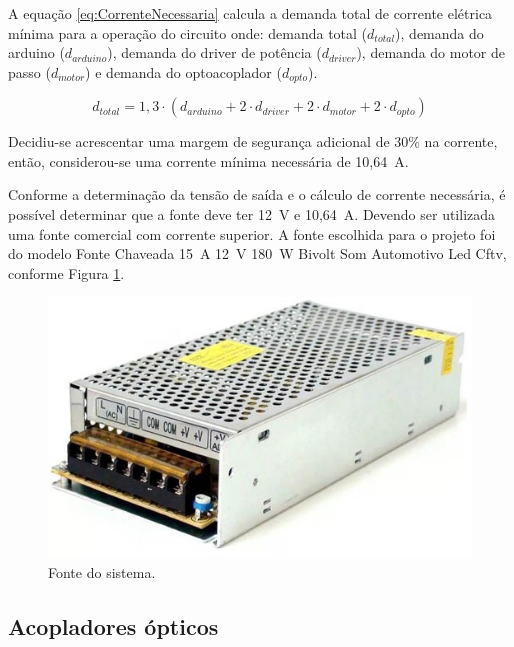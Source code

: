 A equação \ref{eq:CorrenteNecessaria} calcula a demanda total de 
corrente elétrica mínima para a operação do circuito onde:
demanda total ($d_{total}$), demanda do arduino ($d_{arduino}$), demanda do driver de potência ($d_{driver}$),
demanda do motor de passo ($d_{motor}$) e demanda do optoacoplador ($d_{opto}$).

\begin{equation}\label{eq:CorrenteNecessaria}
    d_{total} = 1,3 \cdot (d_{arduino} + 2 \cdot d_{driver} + 2 \cdot d_{motor} + 2 \cdot d_{opto})    
\end{equation}

Decidiu-se acrescentar uma margem de segurança adicional de 30\% na corrente, então, 
considerou-se uma corrente mínima necessária de 10,64~A.

Conforme a determinação da tensão de saída e o cálculo de corrente necessária, 
é possível determinar que a fonte deve ter 12~V e 10,64~A. Devendo ser utilizada uma fonte 
comercial com corrente superior. A fonte escolhida para o projeto foi do modelo 
Fonte Chaveada 15~A 12~V 180~W Bivolt Som Automotivo Led Cftv, 
conforme Figura \ref{fig:fonte}.

\begin{figure}[H]
\centering
\caption{Fonte do sistema.}\label{fig:fonte}
\includegraphics[scale = 0.6]{figuras/fonte}
\end{figure}
    
\subsection{Acopladores ópticos}\label{subsec:metacoplador}

